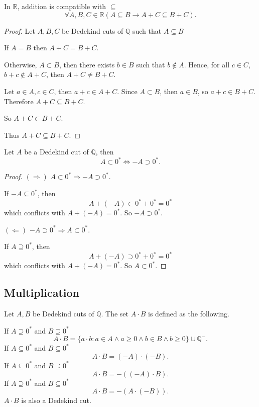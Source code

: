 \begin{theorem}
    In $\mathbb{R}$, addition is compatible with $\subseteq$
    \[
        \forall A, B, C\in\mathbb{R}(A\subseteq B \rightarrow A + C\subseteq B + C).
    \]
\end{theorem}

\begin{proof}
    Let $A, B, C$ be Dedekind cuts of $\mathbb{Q}$ such that $A\subseteq B$

    If $A = B$ then $A + C = B + C$.

    Otherwise, $A\subset B$, then there exists $b\in B$ such that $b\notin A$. Hence, for all $c\in C$, $b + c\notin A + C$, then $A + C\ne B + C$.

    Let $a\in A, c\in C$, then $a + c\in A + C$. Since $A\subset B$, then $a\in B$, so $a + c\in B + C$. Therefore $A + C\subseteq B + C$.

    So $A + C\subset B + C$.

    Thus $A + C\subseteq B + C$.
\end{proof}

\begin{theorem}\label{theorem:chapter1:negation-and-sign}
    Let $A$ be a Dedekind cut of $\mathbb{Q}$, then
    \[
        A\subset {0}^{*} \Longleftrightarrow -A\supset {0}^{*}.
    \]
\end{theorem}

\begin{proof}
    $(\Rightarrow)$ $A\subset {0}^{*}\Longrightarrow -A\supset {0}^{*}$.

    If $-A\subseteq {0}^{*}$, then
    \[
        A + (-A) \subset {0}^{*} + {0}^{*} = {0}^{*}
    \]
    which conflicts with $A + (-A) = {0}^{*}$. So $-A\supset {0}^{*}$.

    $(\Leftarrow)$ $-A\supset {0}^{*}\Longrightarrow A\subset {0}^{*}$.

    If $A\supseteq {0}^{*}$, then
    \[
        A + (-A) \supset {0}^{*} + {0}^{*} = {0}^{*}
    \]
    which conflicts with $A + (-A) = {0}^{*}$. So $A\subset {0}^{*}$.
\end{proof}

\subsection{Multiplication}

\begin{theorem}[Multiplication]\label{theorem:chapter1:multiplication}
    Let $A, B$ be Dedekind cuts of $\mathbb{Q}$. The set $A\cdot B$ is defined as the following.

    If $A\supseteq{0}^{*}$ and $B\supseteq{0}^{*}$
    \[
        A\cdot B = \{ a\cdot b : a\in A\wedge a\ge 0 \wedge b\in B\wedge b\ge 0 \} \cup \mathbb{Q}^{-}.
    \]
    If $A\subseteq{0}^{*}$ and $B\subseteq{0}^{*}$
    \[
        A\cdot B = (-A)\cdot (-B).
    \]
    If $A\subseteq{0}^{*}$ and $B\supseteq{0}^{*}$
    \[
        A\cdot B = -\left((-A)\cdot B\right).
    \]
    If $A\supseteq{0}^{*}$ and $B\subseteq{0}^{*}$
    \[
        A\cdot B = -\left(A\cdot (-B)\right).
    \]
    $A\cdot B$ is also a Dedekind cut.
\end{theorem}

